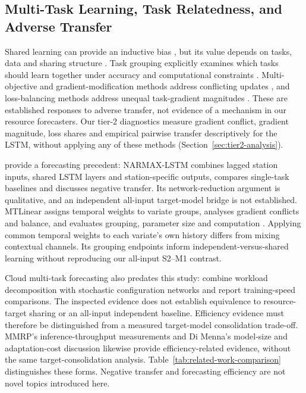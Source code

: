 \documentclass[a4paper,fleqn]{cas-dc}
\begin{document}
\subsection{Multi-Task Learning, Task Relatedness, and Adverse Transfer}
\label{sec:rw-multitask}

Shared learning can provide an inductive bias \citep{Caruana1997Multitask},
but its value depends on tasks, data and sharing structure
\citep{Yu2025MultitaskFundamentals}. Task grouping explicitly examines which
tasks should learn together under accuracy and computational constraints
\citep{Standley2020TaskGrouping,Fifty2021TaskGroupings}.
Multi-objective and gradient-modification methods address conflicting updates
\citep{Sener2018MultiObjective,Yu2020GradientSurgery}, and loss-balancing
methods address unequal task-gradient magnitudes \citep{Chen2018GradNorm}.
These are established responses to adverse transfer, not evidence of a
mechanism in our resource forecasters. Our tier-2 diagnostics measure
gradient conflict, gradient magnitude, loss shares and empirical pairwise
transfer descriptively for the LSTM, without applying any of these methods
(Section~\ref{sec:tier2-analysis}).

\citet{Nikentari2022NARMAXLSTM} provide a forecasting precedent:
NARMAX-LSTM combines lagged station inputs, shared LSTM layers and
station-specific outputs, compares single-task baselines and discusses
negative transfer. Its network-reduction argument is qualitative,
and an independent all-input target-model bridge is not established.
MTLinear assigns temporal weights to variate groups, analyses gradient
conflicts and balance, and evaluates grouping, parameter size and computation
\citep{Nochumsohn2025MTLinear}. Applying common temporal weights to each
variate's own history differs from mixing contextual channels. Its grouping
endpoints inform independent-versus-shared learning without reproducing our
all-input S2--M1 contrast.

Cloud multi-task forecasting also predates this study:
\citet{Bi2019CloudMultitask} combine workload decomposition with stochastic
configuration networks and report training-speed comparisons. The inspected
evidence does not establish equivalence to resource-target sharing or an
all-input independent baseline. Efficiency evidence must therefore be
distinguished from a measured target-model consolidation trade-off.
MMRP's inference-throughput measurements and Di Menna's model-size and
adaptation-cost discussion likewise provide efficiency-related evidence,
without the same target-consolidation analysis.
Table~\ref{tab:related-work-comparison} distinguishes these forms.
Negative transfer and forecasting efficiency are not novel topics introduced here.
\end{document}
